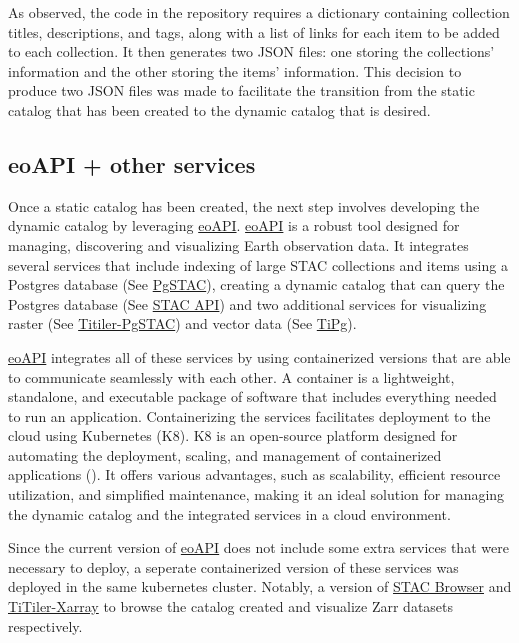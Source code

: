 \documentclass[
  oneside,
  open=any]{scrbook}
\begin{document}
As observed, the code in the repository requires a dictionary containing
collection titles, descriptions, and tags, along with a list of links
for each item to be added to each collection. It then generates two JSON
files: one storing the collections' information and the other storing
the items' information. This decision to produce two JSON files was made
to facilitate the transition from the static catalog that has been
created to the dynamic catalog that is desired.

\subsection{eoAPI + other services}\label{eoapi-other-services}

Once a static catalog has been created, the next step involves
developing the dynamic catalog by leveraging
\href{https://eoapi.dev/}{eoAPI}. \href{https://eoapi.dev/}{eoAPI} is a
robust tool designed for managing, discovering and visualizing Earth
observation data. It integrates several services that include indexing
of large STAC collections and items using a Postgres database (See
\href{https://github.com/stac-utils/pgstac}{PgSTAC}), creating a dynamic
catalog that can query the Postgres database (See
\href{https://github.com/stac-utils/stac-fastapi}{STAC API}) and two
additional services for visualizing raster (See
\href{https://github.com/stac-utils/titiler-pgstac}{Titiler-PgSTAC}) and
vector data (See \href{https://github.com/developmentseed/tipg}{TiPg}).

\href{https://eoapi.dev/}{eoAPI} integrates all of these services by
using containerized versions that are able to communicate seamlessly
with each other. A container is a lightweight, standalone, and
executable package of software that includes everything needed to run an
application. Containerizing the services facilitates deployment to the
cloud using Kubernetes (K8). K8 is an open-source platform designed for
automating the deployment, scaling, and management of containerized
applications (). It
offers various advantages, such as scalability, efficient resource
utilization, and simplified maintenance, making it an ideal solution for
managing the dynamic catalog and the integrated services in a cloud
environment.

Since the current version of \href{https://eoapi.dev/}{eoAPI} does not
include some extra services that were necessary to deploy, a seperate
containerized version of these services was deployed in the same
kubernetes cluster. Notably, a version of
\href{https://github.com/radiantearth/stac-browser}{STAC Browser} and
\href{https://github.com/developmentseed/titiler-xarray}{TiTiler-Xarray}
to browse the catalog created and visualize Zarr datasets respectively.
\end{document}
